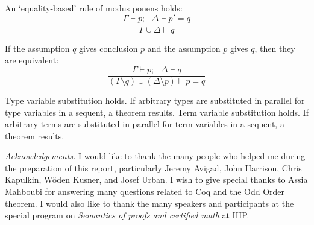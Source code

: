 \documentclass[brochure,english,12pt]{bourbaki}
\theoremstyle{plain}
\begin{document}
\noindent
An `equality-based' rule of modus ponens holds:
$$
\frac{\Gamma\vdash p;~~~\Delta \vdash p'=q}
{\Gamma\cup \Delta \vdash q}
$$

\noindent
If the assumption $q$ gives conclusion $p$ and the assumption $p$
gives $q$, then they are equivalent:
$$
\frac{\Gamma \vdash p;~~~\Delta\vdash q}
{(\Gamma\setminus q)\cup (\Delta\setminus p)
\vdash p=q}
$$

Type variable substitution holds.  If arbitrary types are substituted
in parallel for type variables in a sequent, a theorem results.  Term
variable substitution holds.  If arbitrary terms are substituted in
parallel for term variables in a sequent, a theorem results.







{\it Acknowledgements.}   I would like to thank the many people who helped me
during the preparation of this report, particularly Jeremy Avigad, John Harrison, Chris Kapulkin, 
W\"oden Kusner,  and Josef Urban.  I wish to give special thanks to Assia Mahboubi for answering many questions related
to Coq and the Odd Order theorem.
I would also like to thank the many speakers and participants at the special program on {\it Semantics of proofs and certified 
math} at IHP.

\raggedright

%
\end{document}

